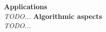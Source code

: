 \begin{frame}
    \begin{columns}[T]
    \textbf{Applications} \\
    \textit{TODO...}
    \textbf{Algorithmic aspects} \\
    \textit{TODO...}
    \end{columns}
\end{frame}

